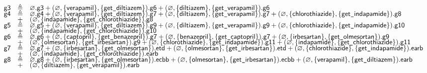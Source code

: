 \begin{figure}[t]
\[\begin{array}{rcl}
\mathsf{g3} &  \triangleq 
& \varnothing.\mathsf{g3} 
+ (\varnothing,\{\mathsf{verapamil}\},\{\mathsf{get}\texttt{\_}\mathsf{diltiazem}\}).\mathsf{g6}
+ (\varnothing,\{\mathsf{diltiazem}\},\{\mathsf{get}\texttt{\_}\mathsf{verapamil}\}).\mathsf{g6}
\\[-4pt]
\mathsf{g4} &  \triangleq 
& \varnothing.\mathsf{g4} 
+ (\varnothing,\{\mathsf{verapamil}\},\{\mathsf{get}\texttt{\_}\mathsf{diltiazem}\}).\mathsf{g7}
+ (\varnothing,\{\mathsf{diltiazem}\},\{\mathsf{get}\texttt{\_}\mathsf{verapamil}\}).\mathsf{g7}
+ (\varnothing,\{\mathsf{chlorothiazide}\},\{\mathsf{get}\texttt{\_}\mathsf{indapamide}\}).\mathsf{g8}
\\[-4pt]
& + & (\varnothing,\{\mathsf{indapamide}\},\{\mathsf{get}\texttt{\_}\mathsf{chlorothiazide}\}).\mathsf{g8}
\\[-4pt]
\mathsf{g5} &  \triangleq 
& \varnothing.\mathsf{g5} 
+ (\varnothing,\{\mathsf{verapamil}\},\{\mathsf{get}\texttt{\_}\mathsf{diltiazem}\}).\mathsf{g9}
+ (\varnothing,\{\mathsf{diltiazem}\},\{\mathsf{get}\texttt{\_}\mathsf{verapamil}\}).\mathsf{g9}
+ (\varnothing,\{\mathsf{chlorothiazide}\},\{\mathsf{get}\texttt{\_}\mathsf{indapamide}\}).\mathsf{g10}
\\[-4pt]
& + & (\varnothing,\{\mathsf{indapamide}\},\{\mathsf{get}\texttt{\_}\mathsf{chlorothiazide}\}).\mathsf{g10}
\\[-4pt]
\mathsf{g6} &  \triangleq 
& \varnothing.\mathsf{g6} 
+ (\varnothing,\{\mathsf{captopril}\},\{\mathsf{get}\texttt{\_}\mathsf{benazepril}\}).\mathsf{g7}
+ (\varnothing,\{\mathsf{benazepril}\},\{\mathsf{get}\texttt{\_}\mathsf{captopril}\}).\mathsf{g7}
+ (\varnothing,\{\mathsf{irbesartan}\},\{\mathsf{get}\texttt{\_}\mathsf{olmesortan}\}).\mathsf{g9}
\\[-4pt]
& + & (\varnothing,\{\mathsf{olmesortan}\},\{\mathsf{get}\texttt{\_}\mathsf{irbesartan}\}).\mathsf{g9}
+ (\varnothing,\{\mathsf{chlorothiazide}\},\{\mathsf{get}\texttt{\_}\mathsf{indapamide}\}).\mathsf{g11}
+ (\varnothing,\{\mathsf{indapamide}\},\{\mathsf{get}\texttt{\_}\mathsf{chlorothiazide}\}).\mathsf{g11}
\\[-4pt]
\mathsf{g7} &  \triangleq 
& \varnothing.\mathsf{g7} 
+ (\varnothing,\{\mathsf{irbesartan}\},\{\mathsf{get}\texttt{\_}\mathsf{olmesortan}\}).\mathsf{etd}
+ (\varnothing,\{\mathsf{olmesortan}\},\{\mathsf{get}\texttt{\_}\mathsf{irbesartan}\}).\mathsf{etd}
+ (\varnothing,\{\mathsf{chlorothiazide}\},\{\mathsf{get}\texttt{\_}\mathsf{indapamide}\}).\mathsf{earb}
\\[-4pt]
& + & (\varnothing,\{\mathsf{indapamide}\},\{\mathsf{get}\texttt{\_}\mathsf{chlorothiazide}\}).\mathsf{earb}
\\[-4pt]
\mathsf{g8} &  \triangleq 
& \varnothing.\mathsf{g8} 
+ (\varnothing,\{\mathsf{irbesartan}\},\{\mathsf{get}\texttt{\_}\mathsf{olmesortan}\}).\mathsf{ecbb}
+ (\varnothing,\{\mathsf{olmesortan}\},\{\mathsf{get}\texttt{\_}\mathsf{irbesartan}\}).\mathsf{ecbb}
+ (\varnothing,\{\mathsf{verapamil}\},\{\mathsf{get}\texttt{\_}\mathsf{diltiazem}\}).\mathsf{earb}
\\[-4pt]
& + & (\varnothing,\{\mathsf{diltiazem}\},\{\mathsf{get}\texttt{\_}\mathsf{verapamil}\}).\mathsf{earb}
\\[-4pt]

\end{array}\]
\end{figure}
